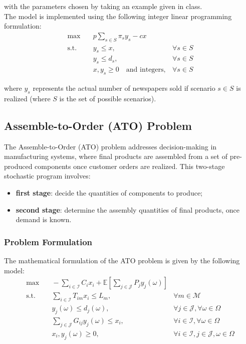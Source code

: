 \documentclass[a4paper,12pt]{article}
\begin{document}
	\noindent with the parameters chosen by taking an example given in class.\\
	
	\noindent The model is implemented using the following integer linear programming formulation:
	\[
	\begin{aligned}
		\max & \quad p \sum_{s \in S} \pi_s y_s - c x \\
		\text{s.t.} & \quad y_s \leq x, & \forall s \in S \\
		& \quad y_s \leq d_s, & \forall s \in S \\
		& \quad x, y_s \geq 0 \quad \text{and integers}, & \forall s \in S
	\end{aligned}
	\]
	
	\noindent	where \( y_s \) represents the actual number of newspapers sold if scenario \( s \in S\) is realized (where $S$ is the set of possible scenarios).
	
	\subsection{Assemble-to-Order (ATO) Problem}
	
	The Assemble-to-Order (ATO) problem addresses decision-making in manufacturing systems, where final products are assembled from a set of pre-produced components once customer orders are realized. This two-stage stochastic program involves:
	\begin{itemize}
		\item \textbf{first stage}: decide the quantities of components to produce;
		\item \textbf{second stage}: determine the assembly quantities of final products, once demand is known.
	\end{itemize}
	
	\subsubsection{Problem Formulation}
	
	The mathematical formulation of the ATO problem is given by the following model:
	\[
	\begin{aligned}
		\max & \quad -\sum_{i \in \mathcal{I}} C_i x_i + \mathbb{E}\left[\sum_{j \in \mathcal{J}} P_j y_j(\omega)\right] \\
		\text{s.t.} & \quad \sum_{i \in \mathcal{I}} T_{im} x_i \leq L_m, & \forall m \in \mathcal{M} \\
		& \quad y_j(\omega) \leq d_j(\omega), & \forall j \in \mathcal{J}, \forall \omega \in \Omega \\
		& \quad \sum_{j \in \mathcal{J}} G_{ij} y_j(\omega) \leq x_i, & \forall i \in \mathcal{I}, \forall \omega \in \Omega \\
		& \quad x_i, y_j(\omega) \geq 0, & \forall i \in \mathcal{I}, j \in \mathcal{J}, \omega \in \Omega
	\end{aligned}
	\]
	
\end{document}
